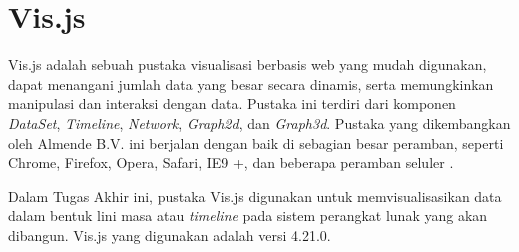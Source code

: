 \section{Vis.js}
\tab Vis.js adalah sebuah pustaka visualisasi berbasis web yang mudah digunakan, dapat menangani jumlah data yang besar secara dinamis, serta memungkinkan manipulasi dan interaksi dengan data. Pustaka ini terdiri dari komponen \textit{DataSet}, \textit{Timeline}, \textit{Network}, \textit{Graph2d}, dan \textit{Graph3d}. Pustaka yang dikembangkan oleh Almende B.V. ini berjalan dengan baik di sebagian besar peramban, seperti Chrome, Firefox, Opera, Safari, IE9 +, dan beberapa peramban seluler \cite{visjs}.

Dalam Tugas Akhir ini, pustaka Vis.js digunakan untuk memvisualisasikan data dalam bentuk lini masa atau \textit{timeline} pada sistem perangkat lunak yang akan dibangun. Vis.js yang digunakan adalah versi 4.21.0.